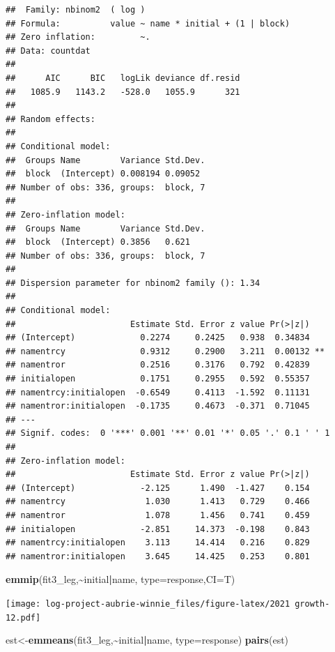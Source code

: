 \documentclass[
]{article}
\newenvironment{Shaded}{\begin{snugshade}}{\end{snugshade}}
\newcommand{\AttributeTok}[1]{\textcolor[rgb]{0.13,0.29,0.53}{#1}}
\newcommand{\FunctionTok}[1]{\textcolor[rgb]{0.13,0.29,0.53}{\textbf{#1}}}
\newcommand{\NormalTok}[1]{#1}
\newcommand{\OtherTok}[1]{\textcolor[rgb]{0.56,0.35,0.01}{#1}}
\newcommand{\SpecialCharTok}[1]{\textcolor[rgb]{0.81,0.36,0.00}{\textbf{#1}}}
\newcommand{\StringTok}[1]{\textcolor[rgb]{0.31,0.60,0.02}{#1}}
\begin{document}
\begin{verbatim}
##  Family: nbinom2  ( log )
## Formula:          value ~ name * initial + (1 | block)
## Zero inflation:         ~.
## Data: countdat
## 
##      AIC      BIC   logLik deviance df.resid 
##   1085.9   1143.2   -528.0   1055.9      321 
## 
## Random effects:
## 
## Conditional model:
##  Groups Name        Variance Std.Dev.
##  block  (Intercept) 0.008194 0.09052 
## Number of obs: 336, groups:  block, 7
## 
## Zero-inflation model:
##  Groups Name        Variance Std.Dev.
##  block  (Intercept) 0.3856   0.621   
## Number of obs: 336, groups:  block, 7
## 
## Dispersion parameter for nbinom2 family (): 1.34 
## 
## Conditional model:
##                       Estimate Std. Error z value Pr(>|z|)   
## (Intercept)             0.2274     0.2425   0.938  0.34834   
## namentrcy               0.9312     0.2900   3.211  0.00132 **
## namentror               0.2516     0.3176   0.792  0.42839   
## initialopen             0.1751     0.2955   0.592  0.55357   
## namentrcy:initialopen  -0.6549     0.4113  -1.592  0.11131   
## namentror:initialopen  -0.1735     0.4673  -0.371  0.71045   
## ---
## Signif. codes:  0 '***' 0.001 '**' 0.01 '*' 0.05 '.' 0.1 ' ' 1
## 
## Zero-inflation model:
##                       Estimate Std. Error z value Pr(>|z|)
## (Intercept)             -2.125      1.490  -1.427    0.154
## namentrcy                1.030      1.413   0.729    0.466
## namentror                1.078      1.456   0.741    0.459
## initialopen             -2.851     14.373  -0.198    0.843
## namentrcy:initialopen    3.113     14.414   0.216    0.829
## namentror:initialopen    3.645     14.425   0.253    0.801
\end{verbatim}

\begin{Shaded}
\begin{Highlighting}[]
\FunctionTok{emmip}\NormalTok{(fit3\_leg,}\SpecialCharTok{\textasciitilde{}}\NormalTok{initial}\SpecialCharTok{|}\NormalTok{name, }\AttributeTok{type=}\StringTok{\textquotesingle{}response\textquotesingle{}}\NormalTok{,}\AttributeTok{CI=}\NormalTok{T)}
\end{Highlighting}
\end{Shaded}

\texttt{[image: log-project-aubrie-winnie\_files/figure-latex/2021 growth-12.pdf]}

\begin{Shaded}
\begin{Highlighting}[]
\NormalTok{est}\OtherTok{\textless{}{-}}\FunctionTok{emmeans}\NormalTok{(fit3\_leg,}\SpecialCharTok{\textasciitilde{}}\NormalTok{initial}\SpecialCharTok{|}\NormalTok{name, }\AttributeTok{type=}\StringTok{\textquotesingle{}response\textquotesingle{}}\NormalTok{)}
\FunctionTok{pairs}\NormalTok{(est)}
\end{Highlighting}
\end{Shaded}
\end{document}
